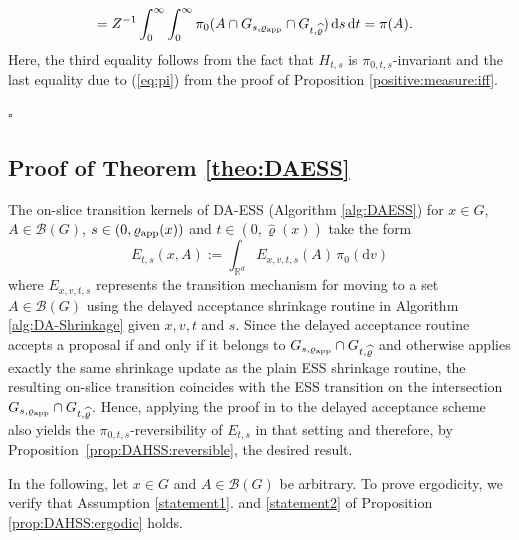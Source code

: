 \documentclass[sn-mathphys-num]{sn-jnl}%
\theoremstyle{thmstyleone}%
\theoremstyle{thmstyletwo}%
\theoremstyle{thmstylethree}%
\newcommand{\rhoapp}{\varrho_{{\rm app}}}
\newcommand{\change}[1]{\bgroup\color{black}#1\egroup}    %
\begin{document}
\begin{appendices}
\begin{align*}
                 &=  Z^{-1} \int_{0}^{\infty} \int_{0}^{\infty} \pi_0(A \cap G_{s,\rhoapp} \cap  G_{t,\widehat{\varrho}}) \, \mathrm{d}s  \, \mathrm{d}t = \pi(A).    
\end{align*}
Here, the third equality follows from the fact that $H_{t,s}$ is $\pi_{0,t,s}$-invariant and the last equality due to (\ref{eq:pi}) from the proof of Proposition \ref{positive:measure:iff}.  
\begin{flushright}    
$\square$
\end{flushright}





\subsection{Proof of Theorem \ref{theo:DAESS}}
\label{app:DAESS}

The on-slice transition kernels of DA-ESS \change{(Algorithm \ref{alg:DAESS})} for $x\in G$, $A\in\mathcal{B}(G)$, $s \in (0, \rhoapp(x))$ and $t \in (0, \widehat{\varrho}(x))$ take the form 
\[
   E_{t,s}(x,A):=\int_{\mathbb R^d} E_{x,v,t,s}(A) \, \pi_0(\mathrm{d} v)
\]
where $E_{x,v,t,s}$ represents the transition mechanism for moving to a set $A\in\mathcal{B}(G)$ using the delayed acceptance shrinkage routine in Algorithm \ref{alg:DA-Shrinkage} given  $x, v, t$ and $s$. 
\change{Since the delayed acceptance routine accepts a proposal if and only if it belongs to $G_{s, \varrho_{\textmd{app}}}\cap G_{t, \widehat{\varrho}}$ and otherwise applies exactly the same shrinkage update as the plain ESS shrinkage routine, the resulting on-slice transition coincides with the ESS transition on the intersection $G_{s, \varrho_{\textmd{app}}}\cap G_{t, \widehat{\varrho}}$. Hence, applying} the proof in \citet[Theorem~3.1]{HasenpflugEtAl2023} to the delayed acceptance scheme also yields the \change{$\pi_{0,t,s}$}-reversibility of $E_{t,s}$ in that setting \change{and therefore, by Proposition~\ref{prop:DAHSS:reversible}, the desired result.} 

In the following, let $x\in G$ and $A\in\mathcal{B}(G)$ be arbitrary. To prove \change{ergodicity}, we verify that Assumption \ref{statement1}. \change{and \ref{statement2}} of Proposition \ref{prop:DAHSS:ergodic} holds. 

\begin{enumerate}


\end{enumerate}
\end{appendices}
\end{document}
